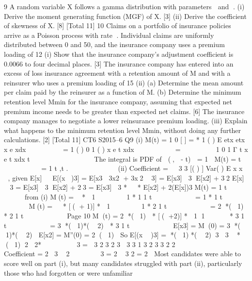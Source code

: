 \documentclass[a4paper,12pt]{article}
\begin{document}
9 A random variable X follows a gamma distribution with parameters  and .
(i) Derive the moment generating function (MGF) of X. [3]
(ii) Derive the coefficient of skewness of X. [8]
[Total 11]
10 Claims on a portfolio of insurance policies arrive as a Poisson process with  rate . Individual claims are uniformly distributed between 0 and 50, and the
insurance company uses a premium loading of 12%
(i) Show that the insurance company’s adjustment coefficient is 0.0066 to four
decimal places. [3]
The insurance company has entered into an excess of loss insurance agreement with a retention amount of M and with a reinsurer who uses a premium loading of 15%
(ii) (a) Determine the mean amount per claim paid by the reinsurer as a
function of M.
(b) Determine the minimum retention level Mmin for the insurance
company, assuming that expected net premium income needs to be greater than expected net claims.
[6]
The insurance company manages to negotiate a lower reinsurance premium loading.
(iii) Explain what happens to the minimum retention level Mmin, without doing
any further calculations. [2]
[Total 11]
CT6 S2015–6
\newpage
  Q9 (i) M(t) = 1
0
[ ] = * 1
( )
E etx etx x e xdx

  
  
= 1 ( )
0
1
( )
x e t xdx

   
  
=
          1
0
1
Γ
t x e t xdx
t
 
   


 
   
The integral is PDF of  (,  - t)  = 1
 M(t) =
  t
   
     
= 1 t ,t .
          
(ii) Coefficient =  
3
3
[( ) ]
Var( )
E x
x
  , given E[x]  
E[(x )3] = E[x3  3x2 + 3x2  3]
= E[x3]  3 E[x2] + 32 E[x]  3
= E[x3]  3 E[x2] + 23
= E[x3]  3 *
  

* E[x2] + 2(E[x])3
M(t) = 1 t         
from (i)
M(t) =  *  1


 

 
1
*
  1
1 t         
=
  1
* 1 t           
M(t) =
  

* [( + 1)] *  1


 

 
1
*
  2
1 t         
= 2
*( 1)

*
  2
1 t         
Page 10
M(t) = 2
*( 1)

* [( +2)] *
   1 1     
*
  3
1 t         
= 3
*( 1)*(  2)

*
  3
1 t         
E[x3] = M(0) = 3
*( 1)*(  2)

E[x2] = M''(0) = 2
( 1)

So
E[(x  )3] = *( 1) *(  2)
3
 3

* ( 1)
2
 2* 


 

 
3
=  3 2 3 2 3 
3 3
1 3 2 3 3 2 2

           
 
Coefficient =
  2
3

2

 

 
3 = 2

3
2
= 2

Most candidates were able to score well on part (i), but many candidates
struggled with part (ii), particularly those who had forgotten or were unfamiliar
\end{document}
